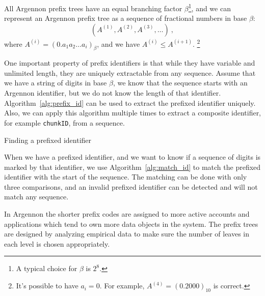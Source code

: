 All Argennon prefix trees have an equal branching
factor \(\beta\)\footnote{A typical choice for \(\beta\) is \(2^8\).}, and we can represent an Argennon
prefix tree as a sequence of fractional numbers in base \(\beta\):
\[
    (A^{(1)},A^{(2)},A^{(3)},\dots)\ ,
\]
where \(A^{(i)}=(0.a_{1}a_{2}\dots a_{i})_\beta\), and we have \(A^{(i)} \leq A^{(i+1)}\). \footnote{It's possible to
have \(a_i=0\). For example, \(A^{(4)}=(0.2000)_{10}\) is correct.}

One important property of prefix identifiers is that while they have variable and unlimited length, they are
uniquely extractable from any sequence. Assume that we have a string of digits in base $\beta$, we
know that the sequence starts with an Argennon identifier, but we do not know the length of that identifier.
Algorithm~\ref{alg:prefix_id} can be used to extract the prefixed identifier uniquely. Also, we can apply this algorithm
multiple times to extract a composite identifier, for example \texttt{chunkID}, from a sequence.

\begin{algorithm}[t]
    \DontPrintSemicolon
    \BlankLine
    \BlankLine
    {
        {
            \;
        }
    }
    \;
    \caption{Finding a prefixed identifier}\label{alg:prefix_id}
\end{algorithm}

When we have a prefixed identifier, and we want to know if a sequence of digits is marked by that identifier,
we use Algorithm~\ref{alg:match_id} to match the prefixed identifier with the start of the sequence. The matching
can be done with only three comparisons, and an invalid prefixed identifier can be detected and will not match
any sequence.

In Argennon the shorter prefix codes are assigned to more active accounts and applications which tend to own more
data objects in the system. The prefix trees are designed by analyzing empirical data to make sure the number
of leaves in each level is chosen appropriately.

